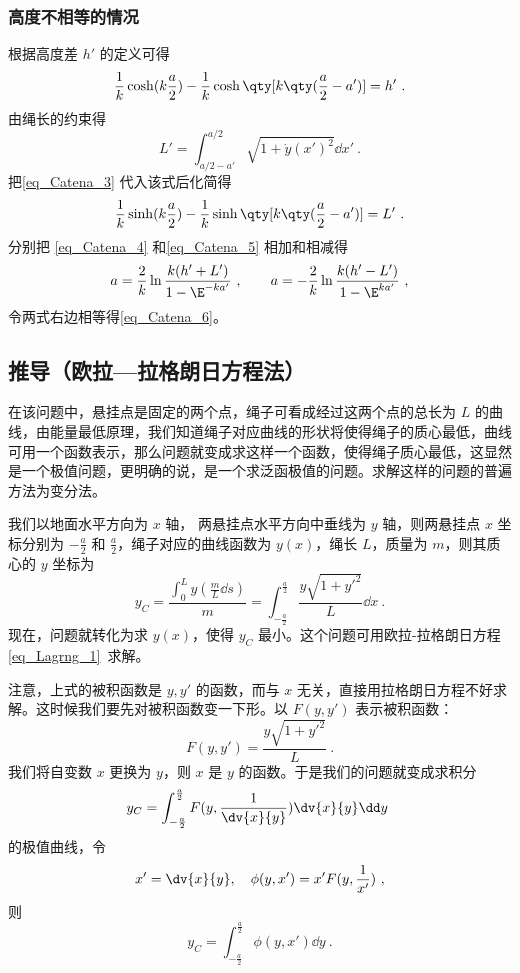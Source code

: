 \subsubsection{高度不相等的情况}
根据高度差 $h'$ 的定义可得
\begin{equation}\label{eq_Catena_4}
\frac{1}{k}\cosh(k\frac{a}{2}) - \frac{1}{k}\cosh\qty[k\qty(\frac{a}{2}-a')] = h'~.
\end{equation}
由绳长的约束得
\begin{equation}
L' = \int_{a/2-a'}^{a/2} \sqrt{1 + \dot y(x')^2} \dd{x'}~.
\end{equation}
把\autoref{eq_Catena_3} 代入该式后化简得
\begin{equation}\label{eq_Catena_5}
\frac{1}{k}\sinh(k\frac{a}{2}) - \frac{1}{k}\sinh\qty[k\qty(\frac{a}{2}-a')] = L'~.
\end{equation}
分别把 \autoref{eq_Catena_4} 和\autoref{eq_Catena_5} 相加和相减得
\begin{equation}
a = \frac{2}{k} \ln\frac{k(h'+L')}{1 - \E^{-ka'}}~,
\qquad
a = -\frac{2}{k} \ln\frac{k(h'-L')}{1 - \E^{ka'}}~,
\end{equation}
令两式右边相等得\autoref{eq_Catena_6}。

\subsection{推导（欧拉—拉格朗日方程法）}
在该问题中，悬挂点是固定的两个点，绳子可看成经过这两个点的总长为 $L$ 的曲线，由能量最低原理，我们知道绳子对应曲线的形状将使得绳子的质心最低，曲线可用一个函数表示，那么问题就变成求这样一个函数，使得绳子质心最低，这显然是一个极值问题，更明确的说，是一个求泛函极值的问题。求解这样的问题的普遍方法为变分法。

我们以地面水平方向为 $x$ 轴， 两悬挂点水平方向中垂线为 $y$ 轴，则两悬挂点 $x$ 坐标分别为 $-\frac{a}{2}$ 和 $\frac{a}{2}$，绳子对应的曲线函数为 $y(x)$，绳长 $L$，质量为 $m$，则其质心的 $y$ 坐标为
\begin{equation}
y_C=\frac{\int_{0}^{L}y(\frac{m}{L}\dd s)}{m}=\int_{-\frac{a}{2}}^{\frac{a}{2}} \frac{y\sqrt{1+y'^2}}{L}\dd x~.
\end{equation}
现在，问题就转化为求 $y(x)$，使得 $y_C$ 最小。这个问题可用欧拉-拉格朗日方程\autoref{eq_Lagrng_1}~求解。

注意，上式的被积函数是 $y,y'$ 的函数，而与 $x$ 无关，直接用拉格朗日方程不好求解。这时候我们要先对被积函数变一下形。以 $F(y,y')$ 表示被积函数： 
\begin{equation}\label{eq_Catena_05}
F(y,y')=\frac{y\sqrt{1+y'^2}}{L}~.
\end{equation}
我们将自变数 $x$ 更换为 $y$，则 $x$ 是 $y$ 的函数。于是我们的问题就变成求积分
\begin{equation}
y_C=\int_{-\frac{a}{2}}^{\frac{a}{2}} F(y,\frac{1}{\dv {x}{y} })\dv{x}{y}\dd y~
\end{equation}
的极值曲线，令 
\begin{equation}\label{eq_Catena_9}
x'=\dv{x}{y},\quad \phi(y,x')=x'F(y,\frac{1}{x'})~,
\end{equation}
则
\begin{equation}
y_C=\int_{-\frac{a}{2}}^{\frac{a}{2}} \phi(y,x')\dd y~.
\end{equation}

